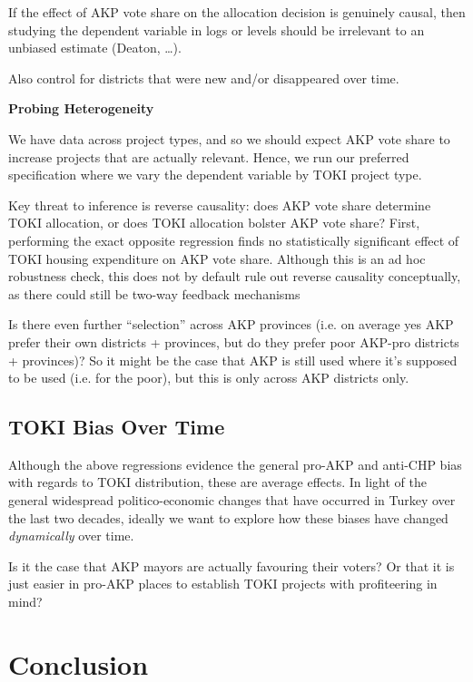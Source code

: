 \documentclass[10pt, oneside]{article}   	%
\numberwithin{equation}{section}
\begin{document}
If the effect of AKP vote share on the allocation decision is genuinely causal, then studying the dependent variable in logs or levels should be irrelevant to an unbiased estimate (Deaton, \dots). 

Also control for districts that were new and/or disappeared over time. 

\textbf{Probing Heterogeneity}

We have data across project types, and so we should expect AKP vote share to increase projects that are actually relevant. Hence, we run our preferred specification where we vary the dependent variable by TOKI project type. 



Key threat to inference is reverse causality: does AKP vote share determine TOKI allocation, or does TOKI allocation bolster AKP vote share? First, performing the exact opposite regression finds no statistically significant effect of TOKI housing expenditure on AKP vote share. Although this is an ad hoc robustness check, this does not by default rule out reverse causality conceptually, as there could still be two-way feedback mechanisms 

Is there even further ``selection'' across AKP provinces (i.e. on average yes AKP prefer their own districts + provinces, but do they prefer poor AKP-pro districts + provinces)? So it might be the case that AKP is still used where it's supposed to be used (i.e. for the poor), but this is only across AKP districts only. 

\subsection{TOKI Bias Over Time}

Although the above regressions evidence the general pro-AKP and anti-CHP bias with regards to TOKI distribution, these are average effects. In light of the general widespread politico-economic changes that have occurred in Turkey over the last two decades, ideally we want to explore how these biases have changed \textit{dynamically} over time. 

Is it the case that AKP mayors are actually favouring their voters? Or that it is just easier in pro-AKP places to establish TOKI projects with profiteering in mind? 

\section{Conclusion}
\end{document}
